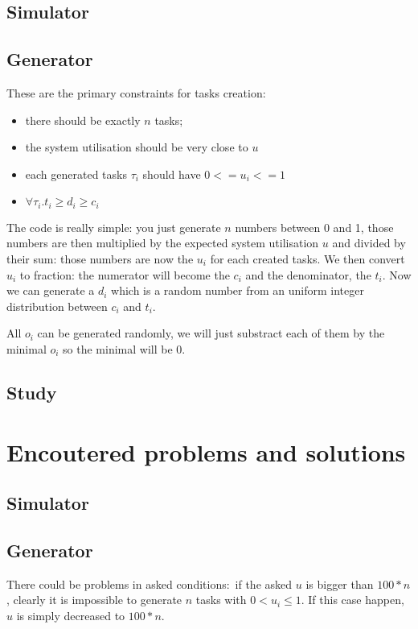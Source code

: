\documentclass[a4paper]{article}
\begin{document}
\subsection{Simulator}



\subsection{Generator}
\label{gendesc}
These are the primary constraints for tasks creation:
\begin{itemize}
  \item there should be exactly $n$ tasks;
  \item the system utilisation should be very close to $u$
  \item each generated tasks $\tau_i$ should have $0 <= u_i <= 1$
  \item $\forall \tau_i. t_i \geq d_i \geq c_i$
\end{itemize}

The code is really simple: you just generate $n$ numbers between 0 and 1, those numbers are then multiplied by the expected system utilisation $u$ and divided by their sum: those numbers are now the $u_i$ for each created tasks.
We then convert $u_i$ to fraction: the numerator will become the $c_i$ and the denominator, the $t_i$. Now we can generate a $d_i$ which is a random number from an uniform integer distribution between $c_i$ and $t_i$.

All $o_i$ can be generated randomly, we will just substract each of them by the minimal $o_i$ so the minimal will be 0.

\subsection{Study}

\section{Encoutered problems and solutions}

\subsection{Simulator}

\subsection{Generator}
There could be problems in asked conditions: if the asked $u$ is bigger than $100 * n$, clearly it is impossible to generate $n$ tasks with $0 < u_i \leq 1$. If this case happen, $u$ is simply decreased to $100 * n$.
\end{document}
